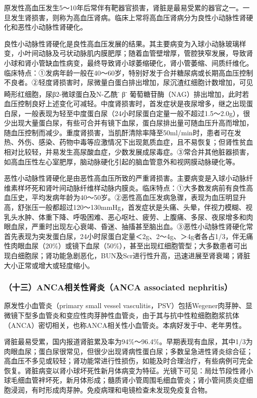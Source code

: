 原发性高血压发生5～10年后常伴有靶器官损害，肾脏是最易受累的器官之一。一旦发生肾损害，则称为高血压肾病。临床上常将高血压肾病分为良性小动脉性肾硬化和恶性小动脉性肾硬化。

良性小动脉性肾硬化是良性高血压发展的结果。其主要病变为入球小动脉玻璃样变，小叶间动脉及弓状动脉肌内膜肥厚；随着血管壁增厚，管腔狭窄发展，导致肾小球和肾小管缺血性病变，最终导致肾小球萎缩硬化，肾小管萎缩、间质纤维化。临床特点：①发病年龄一般在40～60岁，特别好发于合并糖尿病或长期高血压控制不良者。②轻度肾损害时，尿微量白蛋白排出增加，尿沉渣红细胞计数增加，可见畸形红细胞，尿β2-微球蛋白及N-乙酰\textsuperscript{-}
β\textsuperscript{-}
葡萄糖苷酶（NAG）排出增加，此时若血压控制良好上述变化可减轻。中度肾损害时，首发症状是夜尿增多，继之出现蛋白尿，一般表现为轻至中度蛋白尿（24小时尿蛋白定量一般不超过1.5～2.0g），很少出现大量蛋白尿，有些可合并有镜下血尿，蛋白尿排出量可随血压升高而增加，随血压控制而减少。重度肾损害，当肌酐清除率降至50ml/min时，患者可在发热、外伤、感染、药物中毒等应激情况下出现氮质血症，且不易恢复；但肾性贫血相对比较轻，并易发生高尿酸血症，少数发展成尿毒症。③常合并其他脏器损害，如高血压性左心室肥厚，脑动脉硬化引起的脑血管意外和视网膜动脉硬化等。

恶性小动脉性肾硬化是由恶性高血压所致的严重肾损害。主要病变是入球小动脉纤维素样坏死和肾叶间动脉纤维样动脉内膜炎。临床特点：①大多数发病前有良性高血压史，平均发病年龄为40～50岁。②恶性高血压发病急骤，表现为血压明显升高，舒张压一般都超过120～130mmHg，首发症状是头痛、头晕，伴视力模糊、视乳头水肿、体重下降、呼吸困难、恶心呕吐、疲劳、上腹痛、多尿、夜尿增多和肉眼血尿，严重时出现左心衰竭、昏迷、抽搐甚至脑出血。③恶性小动脉性肾硬化常首先表现为突发蛋白尿，24小时尿蛋白定量＜2g、2～4g、＞4g者各占1/3，伴无痛性肉眼血尿（20\%）或镜下血尿（50\%），甚至出现红细胞管型；大多数患者可出现白细胞尿；肾功能急剧恶化，BUN及Scr进行性升高，迅速进展至肾衰竭；肾脏大小正常或增大或轻度缩小。

\subsubsection{（十三）ANCA相关性肾炎（ANCA associated nephritis）}

原发性小血管炎（primary small vessel
vasculitis，PSV）包括Wegener肉芽肿、显微镜下型多血管炎和变应性肉芽肿性血管炎，由于其与抗中性粒细胞胞浆抗体（ANCA）密切相关，也称ANCA相关性小血管炎。本病好发于中、老年男性。

肾脏最易受累，国内报道肾脏累及率为94\%～96.4\%。早期表现有血尿，其中1/3为肉眼血尿；蛋白尿很常见，但很少出现肾病性蛋白尿；多数呈急进性肾炎综合征；高血压不多见或较轻；肾功能常进行性损伤，如能及时合理治疗，有些病例可完全恢复。肾脏病变以肾小球坏死性新月体病变为特征。光镜下可见：局灶节段性肾小球毛细血管袢坏死，新月体形成；髓质肾小管周围毛细血管炎；肾小管间质炎症细胞浸润，有时形成肉芽肿。免疫病理和电镜检查未发现免疫复合物。

